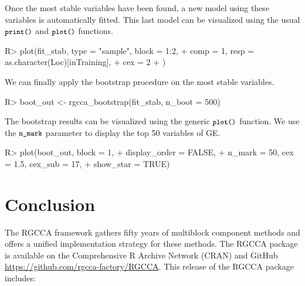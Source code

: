 \documentclass[
]{jss}
\begin{document}
\normalsize

Once the most stable variables have been found, a new model using these
variables is automatically fitted. This last model can be visualized
using the usual \(\small{\texttt{print()}}\) and
\(\small{\texttt{plot()}}\) functions.

\footnotesize

\begin{CodeChunk}
\begin{CodeInput}
R> plot(fit_stab, type = "sample", block = 1:2,
+      comp = 1, resp = as.character(Loc)[inTraining],
+      cex = 2
+      )
\end{CodeInput}
\end{CodeChunk}

\normalsize

We can finally apply the bootstrap procedure on the most stable
variables.

\footnotesize

\begin{CodeChunk}
\begin{CodeInput}
R> boot_out <- rgcca_bootstrap(fit_stab, n_boot = 500)
\end{CodeInput}
\end{CodeChunk}

\normalsize

The bootstrap results can be visualized using the generic
\(\small{\texttt{plot()}}\) function. We use the
\(\small{\texttt{n\_mark}}\) parameter to display the top 50 variables
of GE.

\footnotesize

\begin{CodeChunk}
\begin{CodeInput}
R> plot(boot_out, block = 1,
+      display_order = FALSE,
+      n_mark = 50, cex = 1.5, cex_sub = 17,
+      show_star = TRUE)
\end{CodeInput}
\end{CodeChunk}

\normalsize

\hypertarget{conclusion}{%
\section{Conclusion}\label{conclusion}}

The RGCCA framework gathers fifty years of multiblock component methods
and offers a unified implementation strategy for these methods. The
RGCCA package is available on the Comprehensive R Archive Network (CRAN)
and GitHub \url{https://github.com/rgcca-factory/RGCCA}. This release of
the RGCCA package includes:
\end{document}
